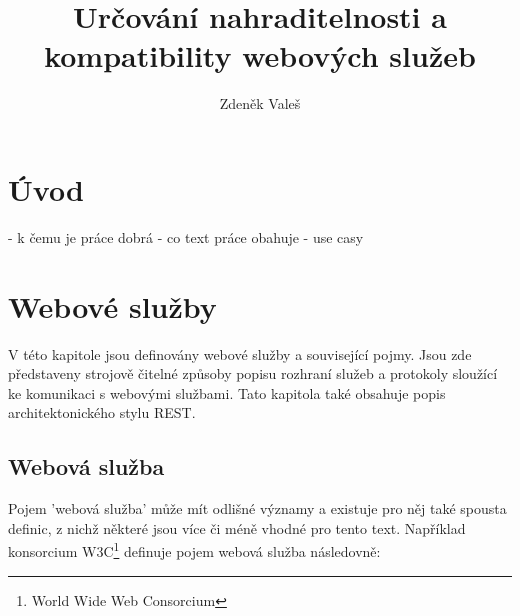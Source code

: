 \documentclass[czech,DP]{thesiskiv}
\author{Zdeněk Valeš}
\title{Určování nahraditelnosti a\\kompatibility webových služeb}
\begin{document}
%
\maketitle
\tableofcontents

\chapter{Úvod}

- k čemu je práce dobrá
- co text práce obahuje
- use casy

\chapter{Webové služby}
\label{sec:web-services-principles}

V této kapitole jsou definovány webové služby a související pojmy. Jsou zde představeny strojově čitelné způsoby popisu rozhraní služeb a protokoly sloužící ke komunikaci s webovými službami. Tato kapitola také obsahuje popis architektonického stylu REST. 

%

\section{Webová služba}




Pojem 'webová služba' může mít odlišné významy\cite{w3cWsDesignIssues} a existuje pro něj také spousta definic, z nichž některé jsou více či méně vhodné pro tento text. Například konsorcium W3C\footnote{World Wide Web Consorcium} definuje pojem webová služba následovně\cite{w3cWsArch}:
\end{document}
